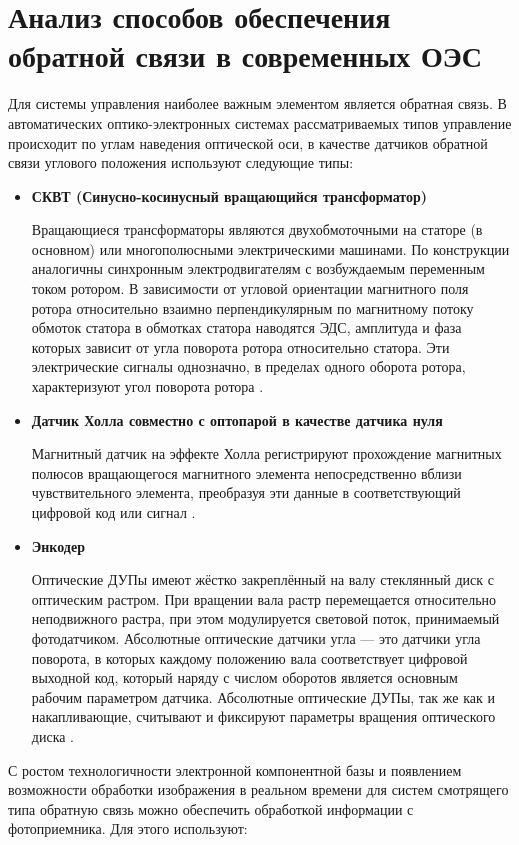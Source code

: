 \section{Анализ способов обеспечения обратной связи в современных ОЭС} \label{sec:ch1/sec3-}

Для системы управления наиболее важным элементом является обратная связь. В автоматических оптико-электронных системах рассматриваемых типов управление происходит по углам наведения оптической оси, в качестве датчиков обратной связи углового положения используют следующие типы:
\begin{itemize}
	\item \textbf{СКВТ (Синусно-косинусный вращающийся трансформатор)}
	
	Вращающиеся трансформаторы являются двухобмоточными на статоре (в основном) или многополюсными электрическими машинами. По конструкции аналогичны синхронным электродвигателям с возбуждаемым переменным током ротором. В зависимости от угловой ориентации магнитного поля ротора относительно взаимно перпендикулярным по магнитному потоку обмоток статора в обмотках статора наводятся ЭДС, амплитуда и фаза которых зависит от угла поворота ротора относительно статора. Эти электрические сигналы однозначно, в пределах одного оборота ротора, характеризуют угол поворота ротора \cite[]{SKVT}.
	
	
	\item \textbf{Датчик Холла совместно с оптопарой в качестве датчика нуля}

	Магнитный датчик на эффекте Холла регистрируют прохождение магнитных полюсов вращающегося магнитного элемента непосредственно вблизи чувствительного элемента, преобразуя эти данные в соответствующий цифровой код или сигнал \cite[]{Encoder}.
	
	\item \textbf{Энкодер}
	
	Оптические ДУПы имеют жёстко закреплённый на валу стеклянный диск с оптическим растром. При вращении вала растр перемещается относительно неподвижного растра, при этом модулируется световой поток, принимаемый фотодатчиком. Абсолютные оптические датчики угла — это датчики угла поворота, в которых каждому положению вала соответствует цифровой выходной код, который наряду с числом оборотов является основным рабочим параметром датчика. Абсолютные оптические ДУПы, так же как и накапливающие, считывают и фиксируют параметры вращения оптического диска \cite[]{Encoder}.
	
\end{itemize}
С ростом технологичности электронной компонентной базы и появлением возможности обработки изображения в реальном времени для систем смотрящего типа обратную связь можно обеспечить обработкой информации с фотоприемника. Для этого используют:


